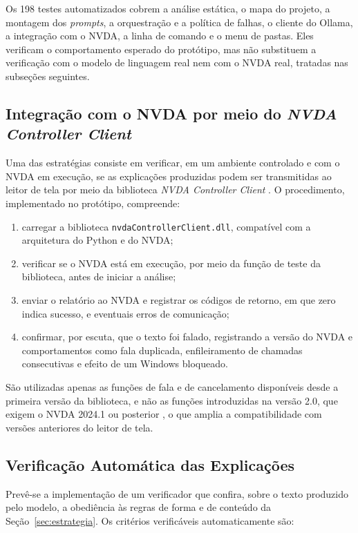 \documentclass[
    12pt,                   %
    openright,              %
    oneside,                %
    a4paper,                %
    sumario=tradicional,    %
    english,                %
    brazil,                 %
    ]{abntex2}
\begin{document}
Os 198 testes automatizados cobrem a análise estática, o mapa do projeto, a montagem dos \textit{prompts}, a orquestração e a política de falhas, o cliente do Ollama, a integração com o NVDA, a linha de comando e o menu de pastas. Eles verificam o comportamento esperado do protótipo, mas não substituem a verificação com o modelo de linguagem real nem com o NVDA real, tratadas nas subseções seguintes.

\subsection{Integração com o NVDA por meio do \textit{NVDA Controller Client}}

Uma das estratégias consiste em verificar, em um ambiente controlado e com o NVDA em execução, se as explicações produzidas podem ser transmitidas ao leitor de tela por meio da biblioteca \textit{NVDA Controller Client} \cite{nvaccess2024controller}. O procedimento, implementado no protótipo, compreende:

\begin{enumerate}
  \item carregar a biblioteca \texttt{nvdaControllerClient.dll}, compatível com a arquitetura do Python e do NVDA;
  \item verificar se o NVDA está em execução, por meio da função de teste da biblioteca, antes de iniciar a análise;
  \item enviar o relatório ao NVDA e registrar os códigos de retorno, em que zero indica sucesso, e eventuais erros de comunicação;
  \item confirmar, por escuta, que o texto foi falado, registrando a versão do NVDA e comportamentos como fala duplicada, enfileiramento de chamadas consecutivas e efeito de um Windows bloqueado.
\end{enumerate}

São utilizadas apenas as funções de fala e de cancelamento disponíveis desde a primeira versão da biblioteca, e não as funções introduzidas na versão 2.0, que exigem o NVDA 2024.1 ou posterior \cite{nvaccess2024controller}, o que amplia a compatibilidade com versões anteriores do leitor de tela.

\subsection{Verificação Automática das Explicações}\label{sec:verificador}

Prevê-se a implementação de um verificador que confira, sobre o texto produzido pelo modelo, a obediência às regras de forma e de conteúdo da Seção~\ref{sec:estrategia}. Os critérios verificáveis automaticamente são:
\end{document}
